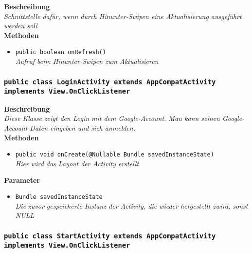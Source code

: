 \documentclass[a4paper]{scrreprt}
\begin{document}
      	        \textbf{Beschreibung} \\
     	        \textit{Schnittstelle dafür, wenn durch Hinunter-Swipen eine Aktualisierung ausgeführt werden soll} \\
                
                \textbf{Methoden}
                \begin{itemize}
        		\item\texttt{{public boolean onRefresh()}}\\
                \textit{Aufruf beim Hinunter-Swipen zum Aktualisieren}\\
                \end{itemize}       
                
      	\subsubsection{\texttt{public class LoginActivity \textbf{extends} AppCompatActivity \textbf{implements} View.OnClickListener}}
        
      	        \textbf{Beschreibung} \\
     	        \textit{Diese Klasse zeigt den Login mit dem Google-Account. Man kann seinen Google-Account-Daten eingeben und sich anmelden.} \\
                
                \textbf{Methoden}
                \begin{itemize}
        		\item\texttt{{public void onCreate(@Nullable Bundle savedInstanceState)}}\\
                \textit{Hier wird das Layout der Activity erstellt.}\\
                \end{itemize}
                
                \textbf{Parameter}
                \begin{itemize}
        		\item\texttt{Bundle savedInstanceState}\\ 
                \textit{Die zuvor gespeicherte Instanz der Activity, die wieder hergestellt zwird, sonst NULL}\\
                \end{itemize}
                
        \subsubsection{\texttt{public class StartActivity extends AppCompatActivity implements View.OnClickListener}}
               
\end{document}
